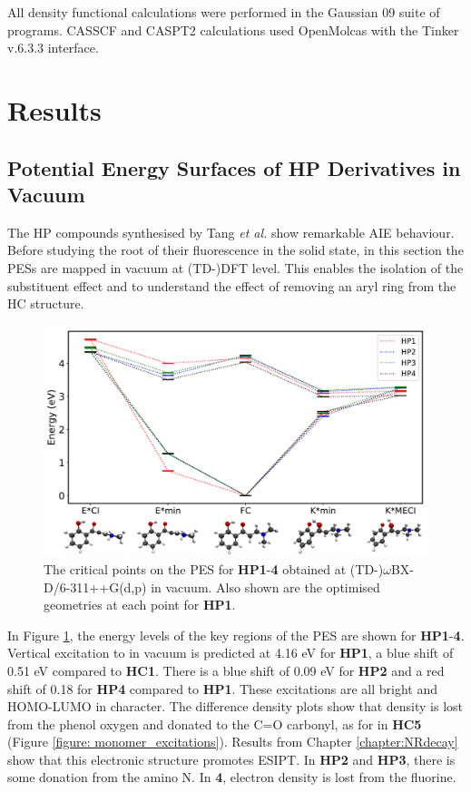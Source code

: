 All density functional calculations were performed in the Gaussian 09 suite of programs.\cite{g09} CASSCF and CASPT2 calculations used OpenMolcas with the Tinker v.6.3.3 interface.\cite{Aquilante2016}
\section{Results}\label{section: Connecting_Results}
\subsection{Potential Energy Surfaces of \textbf{HP} Derivatives in Vacuum} \label{section: Connecting_Vacuum}
The \acf{HP} compounds synthesised by Tang \textit{et al.} show remarkable \ac{AIE} behaviour.  Before studying the root of their fluorescence in the solid state, in this section the \acp{PES} are mapped in vacuum at (TD-)DFT level. This enables the isolation of the substituent effect and to understand the effect of removing an aryl ring from the \ac{HC} structure. 
\begin{figure}[t]
\centering
  \includegraphics[width=0.8\linewidth]{5ConnectingCrystalStructure/2HP_energies_vac.pdf}
  \caption[The vacuum PES of HP\textbf{1}-\textbf{4} with TDDFT]{The critical points on the \ac{PES} for \textbf{HP}\textbf{1}-\textbf{4} obtained at (TD-)$\omega$BX-D/6-311++G(d,p) in vacuum. Also shown are the optimised geometries at each point for \textbf{HP1}.}
  \label{figure: HP_energies_vac}
\end{figure}

In Figure \ref{figure: HP_energies_vac}, the energy levels of the key regions of the \ac{PES} are shown for \textbf{HP1}-\textbf{4}. Vertical excitation to \sone{} in vacuum is predicted at 4.16 eV for \textbf{HP1}, a blue shift of 0.51 eV compared to \textbf{HC1}.  There is a blue shift of 0.09 eV for \textbf{HP2} and a red shift of 0.18 for \textbf{HP4} compared to \textbf{HP1}. These excitations are all  bright and HOMO-LUMO in character. The difference density plots show that density is lost from the phenol oxygen and donated to the C=O carbonyl, as for \sone{} in \textbf{HC5} (Figure \ref{figure: monomer_excitations}). Results from Chapter \ref{chapter:NRdecay} show that this electronic structure promotes ESIPT. In \textbf{HP2} and \textbf{HP3}, there is some donation from the amino N. In \textbf{4}, electron density is lost from the fluorine. 

